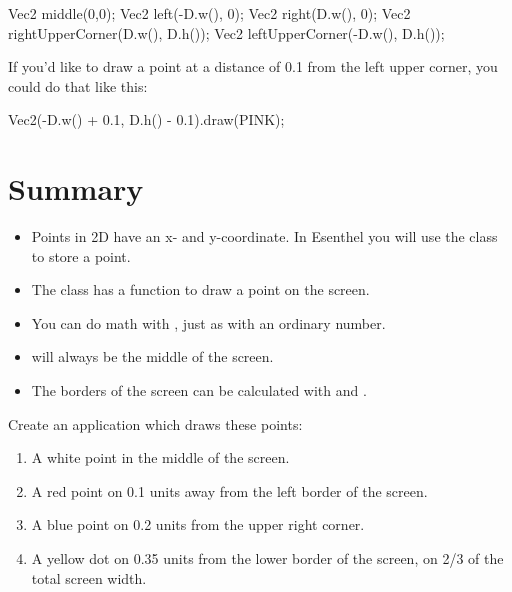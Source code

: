 \begin{code}
Vec2 middle(0,0);
Vec2 left(-D.w(), 0);
Vec2 right(D.w(), 0);
Vec2 rightUpperCorner(D.w(), D.h());
Vec2 leftUpperCorner(-D.w(), D.h());
\end{code}

If you'd like to draw a point at a distance of 0.1 from the left upper corner, you could do that like this:

\begin{code}
Vec2(-D.w() + 0.1, D.h() - 0.1).draw(PINK);
\end{code}

\section{Summary}
\begin{itemize}
\item Points in 2D have an x- and y-coordinate. In Esenthel you will use the class  to store a point.
\item The class  has a function  to draw a point on the screen.
\item You can do math with , just as with an ordinary number.
\item {} will always be the middle of the screen.
\item The borders of the screen can be calculated with  and .
\end{itemize}

\begin{exercise}
Create an application which draws these points:
\begin{enumerate}
	\item A white point in the middle of the screen.
	\item A red point on 0.1 units away from the left border of the screen.
	\item A blue point on 0.2 units from the upper right corner.
	\item A yellow dot on 0.35 units from the lower border of the screen, on 2/3 of the total screen width.
\end{enumerate}
\end{exercise}